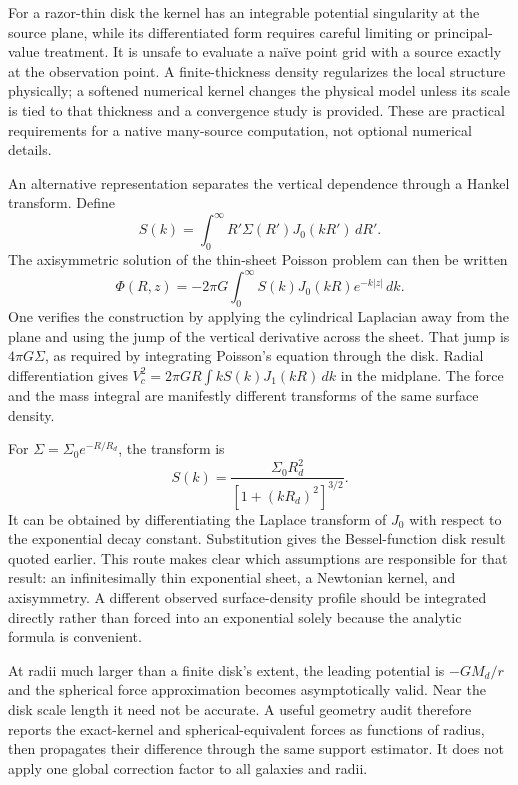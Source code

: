 For a razor-thin disk the kernel has an integrable potential singularity at the source plane, while its differentiated form requires careful limiting or principal-value treatment. It is unsafe to evaluate a naïve point grid with a source exactly at the observation point. A finite-thickness density regularizes the local structure physically; a softened numerical kernel changes the physical model unless its scale is tied to that thickness and a convergence study is provided. These are practical requirements for a native many-source computation, not optional numerical details.

An alternative representation separates the vertical dependence through a Hankel transform. Define
\begin{equation}
 S(k)=\int_0^\infty R'\Sigma(R')J_0(kR')\,dR'.
 \label{c10:hankel}
\end{equation}
The axisymmetric solution of the thin-sheet Poisson problem can then be written
\begin{equation}
 \Phi(R,z)=-2\pi G\int_0^\infty
 S(k)J_0(kR)e^{-k|z|}\,dk.
 \label{c10:hankelpotential}
\end{equation}
One verifies the construction by applying the cylindrical Laplacian away from the plane and using the jump of the vertical derivative across the sheet. That jump is $4\pi G\Sigma$, as required by integrating Poisson's equation through the disk. Radial differentiation gives $V_c^2=2\pi GR\int kS(k)J_1(kR)\,dk$ in the midplane. The force and the mass integral are manifestly different transforms of the same surface density.

For $\Sigma=\Sigma_0e^{-R/R_d}$, the transform is
\begin{equation}
 S(k)=\frac{\Sigma_0R_d^2}{[1+(kR_d)^2]^{3/2}}.
 \label{c10:exponentialtransform}
\end{equation}
It can be obtained by differentiating the Laplace transform of $J_0$ with respect to the exponential decay constant. Substitution gives the Bessel-function disk result quoted earlier. This route makes clear which assumptions are responsible for that result: an infinitesimally thin exponential sheet, a Newtonian kernel, and axisymmetry. A different observed surface-density profile should be integrated directly rather than forced into an exponential solely because the analytic formula is convenient.

At radii much larger than a finite disk's extent, the leading potential is $-GM_d/r$ and the spherical force approximation becomes asymptotically valid. Near the disk scale length it need not be accurate. A useful geometry audit therefore reports the exact-kernel and spherical-equivalent forces as functions of radius, then propagates their difference through the same support estimator. It does not apply one global correction factor to all galaxies and radii.

